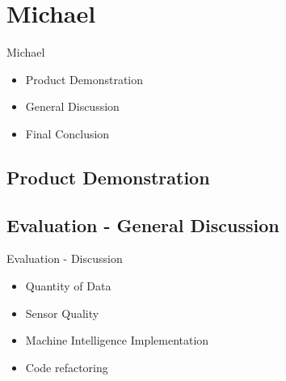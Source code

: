 \section{Michael}
\begin{frame}{Michael}
	\begin{itemize}
		\item Product Demonstration
		\item General Discussion
		\item Final Conclusion
	\end{itemize}
\end{frame}


\subsection{Product Demonstration}


\subsection{Evaluation - General Discussion}
\begin{frame}{Evaluation - Discussion}
	\begin{itemize}
		\item Quantity of Data
		\item Sensor Quality
		\item Machine Intelligence Implementation
		\item Code refactoring
	\end{itemize}
\end{frame}



